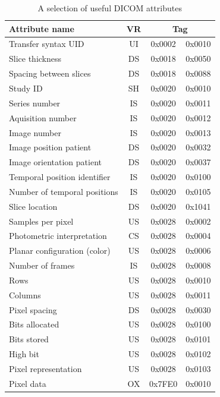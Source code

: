 \begin{table}[ht]
   \centering
   \caption{A selection of useful DICOM attributes \label{tbl:dicom:attribute}}
   \smallskip
   \begin{tabular}{|lcc@{, }c|}
      \hline
      Attribute name & VR & \multicolumn{2}{c|}{Tag}\\
      \hline
      Transfer syntax UID & UI & 0x0002 & 0x0010\\[0.5em]
      Slice thickness & DS & 0x0018 & 0x0050\\
      Spacing between slices & DS & 0x0018 & 0x0088\\[0.5em]
      Study ID & SH & 0x0020 & 0x0010\\
      Series number & IS & 0x0020 & 0x0011\\
      Aquisition number & IS & 0x0020 & 0x0012\\
      Image number & IS & 0x0020 & 0x0013\\
      Image position patient & DS & 0x0020 & 0x0032\\
      Image orientation patient & DS & 0x0020 & 0x0037\\
      Temporal position identifier & IS & 0x0020 & 0x0100\\
      Number of temporal positions & IS & 0x0020 & 0x0105\\
      Slice location & DS & 0x0020 & 0x1041\\[0.5em]
      Samples per pixel & US & 0x0028 & 0x0002\\
      Photometric interpretation & CS & 0x0028 & 0x0004\\
      Planar configuration (color) & US & 0x0028 & 0x0006\\
      Number of frames & IS & 0x0028 & 0x0008\\
      Rows & US & 0x0028 & 0x0010\\
      Columns & US & 0x0028 & 0x0011\\
      Pixel spacing & DS & 0x0028 & 0x0030\\
      Bits allocated & US & 0x0028 & 0x0100\\
      Bits stored & US & 0x0028 & 0x0101\\
      High bit & US & 0x0028 & 0x0102\\
      Pixel representation & US & 0x0028 & 0x0103\\[0.5em]
      Pixel data & OX & 0x7FE0 & 0x0010\\
      \hline
   \end{tabular}
\end{table}

